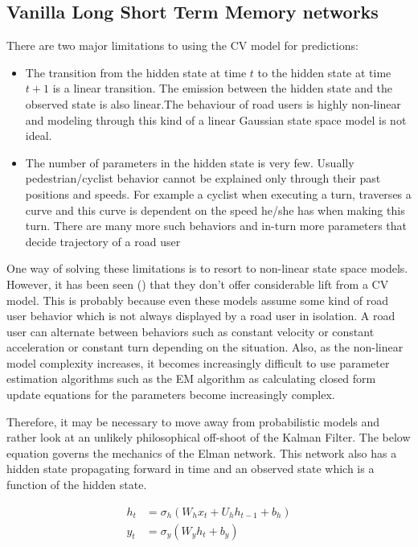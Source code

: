 \documentclass{article}
\begin{document}
\subsection{Vanilla Long Short Term Memory networks}\label{ssec:vanilla_lstm}

There are two major limitations to using the CV model for predictions:
\begin{itemize}
    \item The transition from the hidden state at time $t$ to the hidden state at time $t+1$ is a linear transition. The emission between the hidden state and the observed state is also linear.The behaviour of road users is highly non-linear and modeling through this kind of a linear Gaussian state space model is not ideal.
    \item The number of parameters in the hidden state is very few. Usually pedestrian/cyclist behavior cannot be explained only through their past positions and speeds. For example a cyclist when executing a turn, traverses a curve and this curve is dependent on the speed he/she has when making this turn.  There are many more such behaviors and in-turn more parameters that decide trajectory of a road user
\end{itemize}

One way of solving these limitations is to resort to non-linear state space models. However, it has been seen (\cite{hutchison_pedestrian_2013}) that they don't offer considerable lift from a CV model. This is probably because even these models assume some kind of road user behavior which is not always displayed by a road user in isolation. A road user can alternate between behaviors such as constant velocity or constant acceleration or constant turn depending on the situation. Also, as the non-linear model complexity increases, it becomes increasingly difficult to use parameter estimation algorithms such as the EM algorithm as calculating closed form update equations for the parameters become increasingly complex.

Therefore, it may be necessary to move away from probabilistic models and rather look at an unlikely philosophical off-shoot of the Kalman Filter. The below equation governs the mechanics of the Elman network. This network also has a hidden state propagating forward in time and an observed state which is a function of the hidden state.

\begin{equation}
\begin{split}
    h_t&=\sigma_h(W_hx_t+U_{h}h_{t-1}+b_h)\\
    y_t&=\sigma_y(W_yh_t+b_y)
\end{split}
\end{equation}
\end{document}
